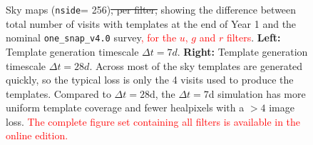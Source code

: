 \documentclass[preprintm,linenumbers]{aastex631}
\newcommand{\baseline}{\texttt{one\_snap\_v4.0}\xspace}
\newcommand{\nside}{\texttt{nside}\xspace}
\providecommand{\red}[1]{\textcolor{red}{#1}}
\begin{document}
\begin{figure}
\begin{tabular}{@{}c@{}c@{}c@{}}
				
			\end{tabular}
			\caption{Sky maps (\nside = 256)\sout{, per filter,} showing the  difference between total number of visits with templates at the end of Year 1 and the nominal \baseline survey\red{, for the $u$, $g$ and $r$ filters}. \textbf{Left:} Template generation timescale $\Delta t = 7 \si{d}$.  \textbf{Right:} Template generation timescale $\Delta t = 28 \si{d}$. Across most of the sky templates are generated quickly, so the typical loss is only the 4 visits used to produce the templates. 
   Compared to $\Delta t = 28$d, the $\Delta t = 7$d simulation has more uniform template coverage and fewer healpixels with a $>4$ image loss.
   \red{The complete figure set containing all filters is available in the online edition.}
			}
			\label{fig:template_skymaps_delta-7_28days}
		\end{figure}

		
\end{document}
